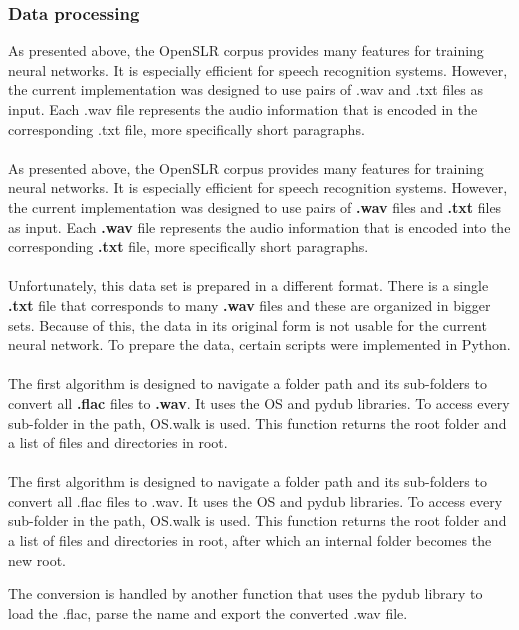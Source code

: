 \subsubsection{Data processing}
As presented above, the OpenSLR corpus provides many features for training neural networks. It is especially efficient for speech recognition systems. However, the current implementation was designed to use pairs of .wav and .txt files as input. Each .wav file represents the audio information that is encoded in the corresponding .txt file, more specifically short paragraphs.\\\\
As presented above, the OpenSLR corpus provides many features for training neural networks. It is especially efficient for speech recognition systems. However, the current implementation was designed to use pairs of \textbf{.wav} files and \textbf{.txt} files as input. Each \textbf{.wav} file represents the audio information that is encoded into the corresponding \textbf{.txt} file, more specifically short paragraphs.\\\\
Unfortunately, this data set is prepared in a different format. There is a single \textbf{.txt} file that corresponds to many \textbf{.wav} files and these are organized in bigger sets. Because of this, the data in its original form is not usable for the current neural network. To prepare the data, certain scripts were implemented in Python.\\\\
The first algorithm is designed to navigate a folder path and its sub-folders to convert all \textbf{.flac} files to \textbf{.wav}. It uses the OS and pydub libraries. 
To access every sub-folder in the path, OS.walk is used. This function returns the root folder and a list of files and directories in root.\\\\
The first algorithm is designed to navigate a folder path and its sub-folders to convert all .flac files to .wav. It uses the OS and pydub libraries. To access every sub-folder in the path, OS.walk is used. This function returns the root folder and a list of files and directories in root, after which an internal folder becomes the new root.



The conversion is handled by another function that uses the pydub library to load the .flac, parse the name and   export the converted .wav file.

